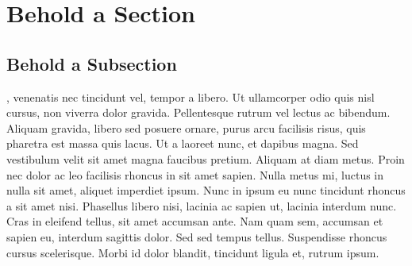 \documentclass{tufte-handout}
\begin{document}
\section{Behold a Section}

\subsection{Behold a Subsection}
, venenatis nec tincidunt vel, tempor a libero. Ut ullamcorper odio quis nisl cursus, non viverra dolor gravida. Pellentesque rutrum vel lectus ac bibendum. Aliquam gravida, libero sed posuere ornare, purus arcu facilisis risus, quis pharetra est massa quis lacus. Ut a laoreet nunc, et dapibus magna. Sed vestibulum velit sit amet magna faucibus pretium. Aliquam at diam metus. Proin nec dolor ac leo facilisis rhoncus in sit amet sapien. Nulla metus mi, luctus in nulla sit amet, aliquet imperdiet ipsum. Nunc in ipsum eu nunc tincidunt rhoncus a sit amet nisi. Phasellus libero nisi, lacinia ac sapien ut, lacinia interdum nunc. Cras in eleifend tellus, sit amet accumsan ante. Nam quam sem, accumsan et sapien eu, interdum sagittis dolor. Sed sed tempus tellus. Suspendisse rhoncus cursus scelerisque. Morbi id dolor blandit, tincidunt ligula et, rutrum ipsum.


\pgfplotsset{width=10cm,compat=1.9}



\begin{figure}
\end{figure}
\end{document}
